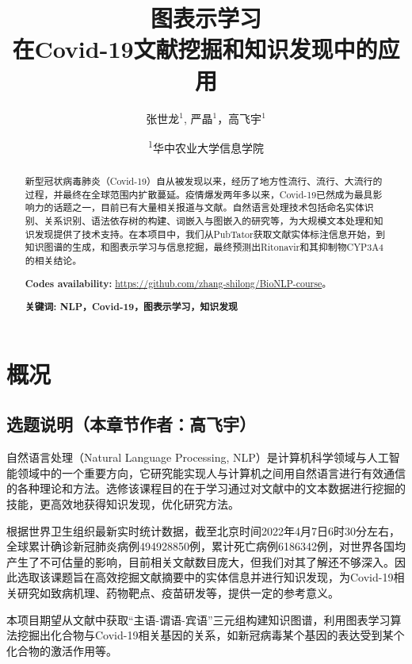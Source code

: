 \documentclass[twocolumn]{article}
\title{图表示学习\\在Covid-19文献挖掘和知识发现中的应用}
\author{张世龙$^{1}$, 严晶$^{1}$，高飞宇$^{1}$}
\date{
\textsuperscript{1}华中农业大学信息学院}
\begin{document}
\maketitle

\begin{abstract}
新型冠状病毒肺炎（Covid-19）自从被发现以来，经历了地方性流行、流行、大流行的过程，并最终在全球范围内扩散蔓延。疫情爆发两年多以来，Covid-19已然成为最具影响力的话题之一，目前已有大量相关报道与文献。自然语言处理技术包括命名实体识别、关系识别、语法依存树的构建、词嵌入与图嵌入的研究等，为大规模文本处理和知识发现提供了技术支持。在本项目中，我们从PubTator获取文献实体标注信息开始，到知识图谱的生成，和图表示学习与信息挖掘，最终预测出Ritonavir和其抑制物CYP3A4的相关结论。\par
{\bf Codes availability:} \url{https://github.com/zhang-shilong/BioNLP-course}。\par
{\bf 关键词: NLP，Covid-19，图表示学习，知识发现}
\end{abstract}

\maketitle

\section{概况}
\subsection{选题说明（本章节作者：高飞宇）}
自然语言处理（Natural Language Processing, NLP）是计算机科学领域与人工智能领域中的一个重要方向，它研究能实现人与计算机之间用自然语言进行有效通信的各种理论和方法。选修该课程目的在于学习通过对文献中的文本数据进行挖掘的技能，更高效地获得知识发现，优化研究方法。\par
根据世界卫生组织最新实时统计数据，截至北京时间2022年4月7日6时30分左右，全球累计确诊新冠肺炎病例494928850例，累计死亡病例6186342例，对世界各国均产生了不可估量的影响，目前相关文献数目庞大，但我们对其了解还不够深入。因此选取该课题旨在高效挖掘文献摘要中的实体信息并进行知识发现，为Covid-19相关研究如致病机理、药物靶点、疫苗研发等，提供一定的参考意义。\par
本项目期望从文献中获取“主语-谓语-宾语”三元组构建知识图谱，利用图表学习算法挖掘出化合物与Covid-19相关基因的关系，如新冠病毒某个基因的表达受到某个化合物的激活作用等。\par
\end{document}
